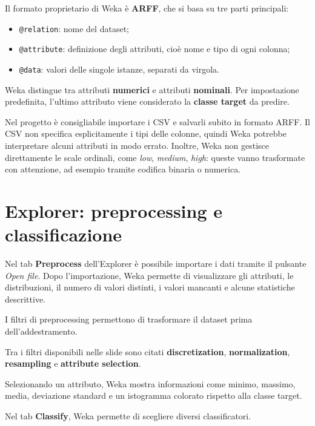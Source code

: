 Il formato proprietario di Weka è \textbf{ARFF}, che si basa su tre parti principali:

\begin{itemize}
    \item \texttt{@relation}: nome del dataset;
    \item \texttt{@attribute}: definizione degli attributi, cioè nome e tipo di ogni colonna;
    \item \texttt{@data}: valori delle singole istanze, separati da virgola.
\end{itemize}

Weka distingue tra attributi \textbf{numerici} e attributi \textbf{nominali}. Per impostazione predefinita, l'ultimo attributo viene considerato la \textbf{classe target} da predire.

\begin{notaprof}
Nel progetto è consigliabile importare i CSV e salvarli subito in formato ARFF. Il CSV non specifica esplicitamente i tipi delle colonne, quindi Weka potrebbe interpretare alcuni attributi in modo errato. Inoltre, Weka non gestisce direttamente le scale ordinali, come \emph{low}, \emph{medium}, \emph{high}: queste vanno trasformate con attenzione, ad esempio tramite codifica binaria o numerica.
\end{notaprof}

\section{Explorer: preprocessing e classificazione}

Nel tab \textbf{Preprocess} dell'Explorer è possibile importare i dati tramite il pulsante \emph{Open file}. Dopo l'importazione, Weka permette di visualizzare gli attributi, le distribuzioni, il numero di valori distinti, i valori mancanti e alcune statistiche descrittive.

I filtri di preprocessing permettono di trasformare il dataset prima dell'addestramento.

\begin{notaslide}
Tra i filtri disponibili nelle slide sono citati \textbf{discretization}, \textbf{normalization}, \textbf{resampling} e \textbf{attribute selection}.
\end{notaslide}

Selezionando un attributo, Weka mostra informazioni come minimo, massimo, media, deviazione standard e un istogramma colorato rispetto alla classe target.

Nel tab \textbf{Classify}, Weka permette di scegliere diversi classificatori.

